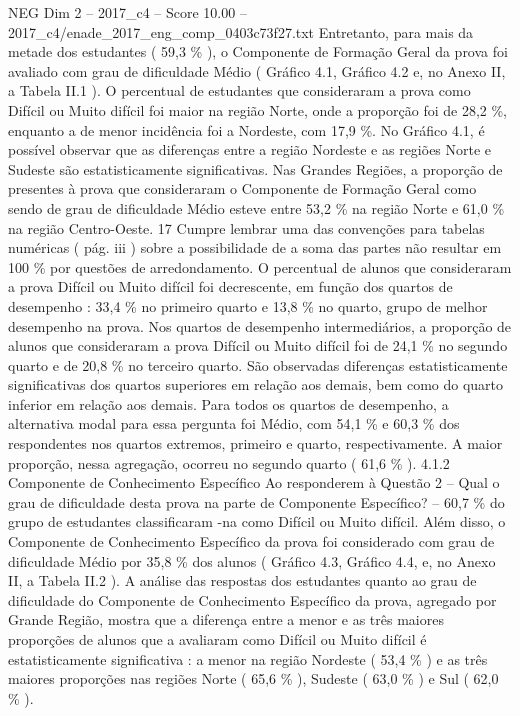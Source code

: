 \begin{textsample}{NEG Dim 2 – 2017\_c4 – Score 10.00 – 2017\_c4/enade\_2017\_eng\_comp\_0403c73f27.txt}
Entretanto, para mais da metade dos estudantes ( 59,3 \% ), o Componente de Formação Geral da prova foi avaliado com grau de dificuldade Médio ( Gráfico 4.1, Gráfico 4.2 e, no Anexo II, a Tabela II.1 ).
O percentual de estudantes que consideraram a prova como Difícil ou Muito difícil foi maior na região Norte, onde a proporção foi de 28,2 \%, enquanto a de menor incidência foi a Nordeste, com 17,9 \%.
No Gráfico 4.1, é possível observar que as diferenças entre a região Nordeste e as regiões Norte e Sudeste são estatisticamente significativas.
Nas Grandes Regiões, a proporção de presentes à prova que consideraram o Componente de Formação Geral como sendo de grau de dificuldade Médio esteve entre 53,2 \% na região Norte e 61,0 \% na região Centro-Oeste. 17 Cumpre lembrar uma das convenções para tabelas numéricas ( pág. iii ) sobre a possibilidade de a soma das partes não resultar em 100 \% por questões de arredondamento.
O percentual de alunos que consideraram a prova Difícil ou Muito difícil foi decrescente, em função dos quartos de desempenho : 33,4 \% no primeiro quarto e 13,8 \% no quarto, grupo de melhor desempenho na prova.
Nos quartos de desempenho intermediários, a proporção de alunos que consideraram a prova Difícil ou Muito difícil foi de 24,1 \% no segundo quarto e de 20,8 \% no terceiro quarto.
São observadas diferenças estatisticamente significativas dos quartos superiores em relação aos demais, bem como do quarto inferior em relação aos demais.
Para todos os quartos de desempenho, a alternativa modal para essa pergunta foi Médio, com 54,1 \% e 60,3 \% dos respondentes nos quartos extremos, primeiro e quarto, respectivamente.
A maior proporção, nessa agregação, ocorreu no segundo quarto ( 61,6 \% ). 4.1.2 Componente de Conhecimento Específico Ao responderem à Questão 2 – Qual o grau de dificuldade desta prova na parte de Componente Específico? – 60,7 \% do grupo de estudantes classificaram -na como Difícil ou Muito difícil.
Além disso, o Componente de Conhecimento Específico da prova foi considerado com grau de dificuldade Médio por 35,8 \% dos alunos ( Gráfico 4.3, Gráfico 4.4, e, no Anexo II, a Tabela II.2 ).
A análise das respostas dos estudantes quanto ao grau de dificuldade do Componente de Conhecimento Específico da prova, agregado por Grande Região, mostra que a diferença entre a menor e as três maiores proporções de alunos que a avaliaram como Difícil ou Muito difícil é estatisticamente significativa : a menor na região Nordeste ( 53,4 \% ) e as três maiores proporções nas regiões Norte ( 65,6 \% ), Sudeste ( 63,0 \% ) e Sul ( 62,0 \% ).

\end{textsample}
